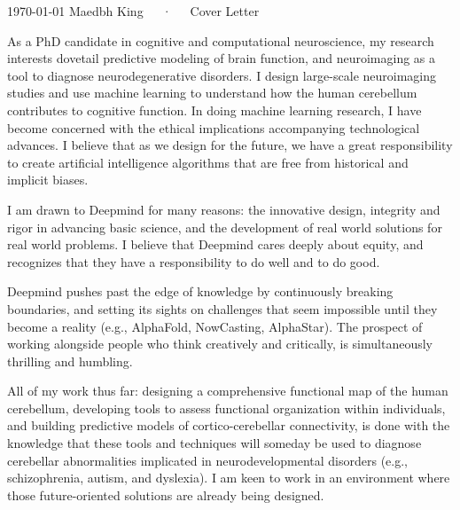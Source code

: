 \documentclass[11pt, a4paper]{maedbh-cv}
\begin{document}
\makecvheader[R]

\makecvfooter
  {\today}
  {Maedbh King~~~·~~~Cover Letter}
  {}

\makelettertitle

\begin{cvletter}

As a PhD candidate in cognitive and computational neuroscience, my research interests dovetail predictive modeling of brain function, and neuroimaging as a tool to diagnose neurodegenerative disorders. I design large-scale neuroimaging studies and use machine learning to understand how the human cerebellum contributes to cognitive function. In doing machine learning research, I have become concerned with the ethical implications accompanying technological advances. I believe that as we design for the future, we have a great responsibility to create artificial intelligence algorithms that are free from historical and implicit biases.


I am drawn to Deepmind for many reasons: the innovative design, integrity and rigor in advancing basic science, and the development of real world solutions for real world problems. I believe that Deepmind cares deeply about equity, and recognizes that they have a responsibility to do well and to do good. 

Deepmind pushes past the edge of knowledge by continuously breaking boundaries, and setting its sights on challenges that seem impossible until they become a reality (e.g., AlphaFold, NowCasting, AlphaStar). The prospect of working alongside people who think creatively and critically, is simultaneously thrilling and humbling.

 
All of my work thus far: designing a comprehensive functional map of the human cerebellum, developing tools to assess functional organization within individuals, and building predictive models of cortico-cerebellar connectivity, is done with the knowledge that these tools and techniques will someday be used to diagnose cerebellar abnormalities implicated in neurodevelopmental disorders (e.g., schizophrenia, autism, and dyslexia). I am keen to work in an environment where those future-oriented solutions are already being designed. 


\end{cvletter}
\end{document}
